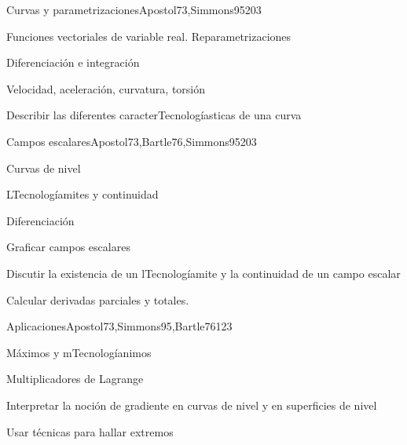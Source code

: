 \begin{syllabus}
\begin{unit}{Curvas y parametrizaciones}{}{Apostol73,Simmons95}{20}{3}
   \begin{topics}
      \item Funciones vectoriales de variable real. Reparametrizaciones
      \item Diferenciación e integración
      \item Velocidad, aceleración, curvatura, torsión
      \end{topics}

   \begin{learningoutcomes}
      \item Describir las diferentes caracterTecnologíasticas de una curva
      \end{learningoutcomes}
\end{unit}

\begin{unit}{Campos escalares}{}{Apostol73,Bartle76,Simmons95}{20}{3}
   \begin{topics}
      \item Curvas de nivel
      \item LTecnologíamites y continuidad
      \item Diferenciación
      \end{topics}

   \begin{learningoutcomes}
      \item Graficar campos escalares
      \item Discutir la existencia de un lTecnologíamite y la continuidad de un campo escalar
      \item Calcular derivadas parciales y totales.
      \end{learningoutcomes}
\end{unit}

\begin{unit}{Aplicaciones}{}{Apostol73,Simmons95,Bartle76}{12}{3}
   \begin{topics}
      \item Máximos y mTecnologíanimos
      \item Multiplicadores de Lagrange
      \end{topics}

   \begin{learningoutcomes}
      \item Interpretar la noción de gradiente en curvas de nivel y en superficies de nivel
      \item Usar técnicas para hallar extremos
      \end{learningoutcomes}
\end{unit}


\end{syllabus}
